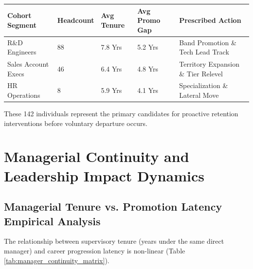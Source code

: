 \documentclass[12pt,a4paper,oneside]{article}
\begin{document}
\begin{center}
\fontsize{9}{11}\selectfont
\begin{tabular}{|L{3.2cm}|C{2.2cm}|C{2.2cm}|C{2.2cm}|L{4.2cm}|}
\hline
\textbf{Cohort Segment} & \textbf{Headcount} & \textbf{Avg Tenure} & \textbf{Avg Promo Gap} & \textbf{Prescribed Action} \\ \hline
R\&D Engineers & 88 & 7.8 Yrs & 5.2 Yrs & Band Promotion \& Tech Lead Track \\ \hline
Sales Account Execs & 46 & 6.4 Yrs & 4.8 Yrs & Territory Expansion \& Tier Relevel \\ \hline
HR Operations & 8 & 5.9 Yrs & 4.1 Yrs & Specialization \& Lateral Move \\ \hline
\end{tabular}
\vspace{0.02in}
\label{tab:priority_queue_breakdown}
\end{center}

These 142 individuals represent the primary candidates for proactive retention interventions before voluntary departure occurs.

\section{Managerial Continuity and Leadership Impact Dynamics}

\subsection{Managerial Tenure vs. Promotion Latency Empirical Analysis}
The relationship between supervisory tenure (years under the same direct manager) and career progression latency is non-linear (Table \ref{tab:manager_continuity_matrix}).
\end{document}
